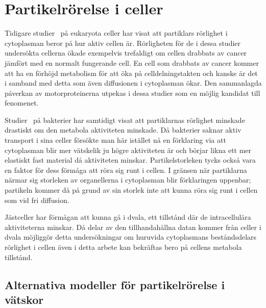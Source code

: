 \chapter{Partikelrörelse i celler}




Tidigare studier~\cite{Gou_etal2014} på eukaryota celler har visat att
partiklars rörlighet i cytoplasman beror på hur aktiv cellen
är. Rörligheten för de i dessa studier undersökta cellerna ökade exempelvis
trefaldigt om cellen drabbats av cancer jämfört med en normalt
fungerande cell. En cell som drabbats av cancer kommer att ha en
förhöjd metabolism för att öka på celldelningstakten och kanske är det i samband med detta som även diffusionen i cytoplasman ökar. Den sammanlagda
påverkan av motorproteinerna utpekas i dessa studier
som en möjlig kandidat till fenomenet. 

Studier~\cite{Parry_etal2014} på bakterier har samtidigt visat att
partiklarnas rörlighet minskade drastiskt om den metabola aktiviteten
minskade. Då bakterier saknar aktiv transport i sina celler försökte man här istället nå en förklaring via att
cytoplasman blir mer vätskelik ju högre aktiviteten är och börjar
likna ett mer elastiskt fast material då aktiviteten
minskar. Partikelstorleken tycks också vara en faktor för dess förmåga
att röra sig runt i cellen. I gränsen när partiklarna närmar sig
storleken av organellerna i cytoplasman blir förklaringen uppenbar;
partikeln kommer då på grund av sin storlek inte att kunna röra sig
runt i cellen som vid fri diffusion. 

Jästceller har förmågan att kunna gå i dvala, ett tillstånd där de
intracellulära aktiviteterna minskar. Då delar av den tillhandahållna
datan kommer från celler i dvala möjliggör detta undersökningar om
huruvida cytoplasmans beståndsdelars rörlighet i cellen även i detta arbete kan bekräftas bero på
cellens metabola tillstånd. 


\section{Alternativa modeller för partikelrörelse i vätskor}

